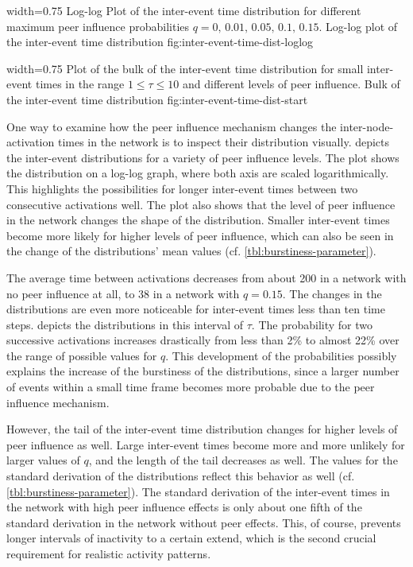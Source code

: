       {width=0.75\textwidth}
      {Log-log Plot of the inter-event time distribution for different maximum peer influence probabilities \( q = 0, \, 0.01, \, 0.05, \, 0.1, \, 0.15\).}
      {Log-log plot of the inter-event time distribution}
      {fig:inter-event-time-dist-loglog}


      {width=0.75\textwidth}
      {Plot of the bulk of the inter-event time distribution for small inter-event times in the range \( 1 \leq \tau \leq 10 \) and different levels of peer influence.}
      {Bulk of the inter-event time distribution}
      {fig:inter-event-time-dist-start}


One way to examine how the peer influence mechanism changes the inter-node-activation times in the network is to inspect their distribution visually.
 depicts the inter-event distributions for a variety of peer influence levels.
The plot shows the distribution on a log-log graph, where both axis are scaled logarithmically.
This highlights the possibilities for longer inter-event times between two consecutive activations well.
The plot also shows that the level of peer influence in the network changes the shape of the distribution.
Smaller inter-event times become more likely for higher levels of peer influence, which can also be seen in the change of the distributions' mean values (cf. \cref{tbl:burstiness-parameter}).

The average time between activations decreases from about 200 in a network with no peer influence at all, to 38 in a network with \( q = 0.15 \).
The changes in the distributions are even more noticeable for inter-event times less than ten time steps.
 depicts the distributions in this interval of \( \tau \).
The probability for two successive activations increases drastically from less than 2\% to almost 22\% over the range of possible values for \( q \).
This development of the probabilities possibly explains the increase of the burstiness of the distributions, since a larger number of events within a small time frame becomes more probable due to the peer influence mechanism.

However, the tail of the inter-event time distribution changes for higher levels of peer influence as well.
Large inter-event times become more and more unlikely for larger values of \( q \), and the length of the tail decreases as well.
The values for the standard derivation of the distributions reflect this behavior as well (cf. \cref{tbl:burstiness-parameter}).
The standard derivation of the inter-event times in the network with high peer influence effects is only about one fifth of the standard derivation in the network without peer effects.
This, of course, prevents longer intervals of inactivity to a certain extend, which is the second crucial requirement for realistic activity patterns.


